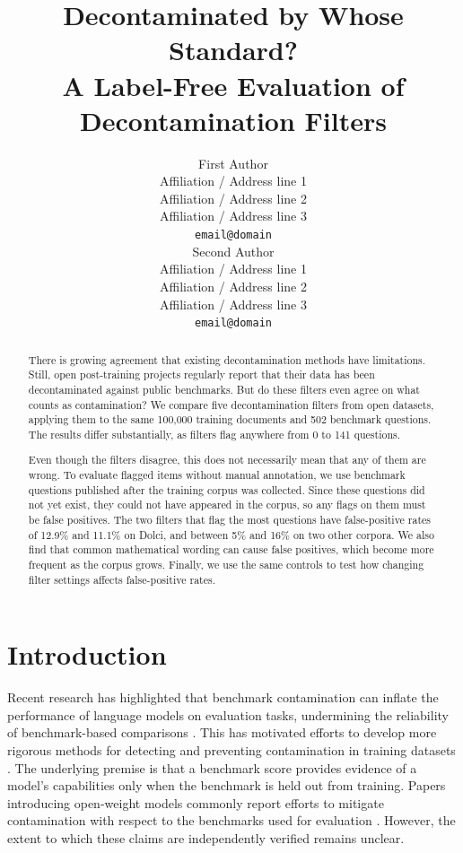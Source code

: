 \documentclass[11pt]{article}
\title{Decontaminated by Whose Standard? \\
A Label-Free Evaluation of Decontamination Filters}
\author{First Author \\
  Affiliation / Address line 1 \\
  Affiliation / Address line 2 \\
  Affiliation / Address line 3 \\
  \texttt{email@domain} \\\And
  Second Author \\
  Affiliation / Address line 1 \\
  Affiliation / Address line 2 \\
  Affiliation / Address line 3 \\
  \texttt{email@domain} \\}
\begin{document}
\maketitle
\begin{abstract}
There is growing agreement that existing decontamination methods have limitations. Still, open post-training projects regularly report that their data has been decontaminated against public benchmarks. But do these filters even agree on what counts as contamination? We compare five decontamination filters from open datasets, applying them to the same 100,000 training documents and 502 benchmark questions. The results differ substantially, as filters flag anywhere from 0 to 141 questions.

Even though the filters disagree, this does not necessarily mean that any of them are wrong. To evaluate flagged items without manual annotation, we use benchmark questions published after the training corpus was collected. Since these questions did not yet exist, they could not have appeared in the corpus, so any flags on them must be false positives. The two filters that flag the most questions have false-positive rates of 12.9\% and 11.1\% on Dolci, and between 5\% and 16\% on two other corpora. We also find that common mathematical wording can cause false positives, which become more frequent as the corpus grows. Finally, we use the same controls to test how changing filter settings affects false-positive rates.
\end{abstract}

\section{Introduction}

Recent research has highlighted that benchmark contamination can inflate the performance of language models on evaluation tasks, undermining the reliability of benchmark-based comparisons \citep{chen-etal-2025-benchmarking-large,oren2024,sainz2023}. This has motivated efforts to develop more rigorous methods for detecting and preventing contamination in training datasets \citep{xu-etal-2025-dcr,controllable,detectable}. The underlying premise is that a benchmark score provides evidence of a model's capabilities only when the benchmark is held out from training. Papers introducing open-weight models commonly report efforts to mitigate contamination with respect to the benchmarks used for evaluation \citep{s1,tulu3,openthoughts,olmo2025olmo3}. However, the extent to which these claims are independently verified remains unclear.
\end{document}
